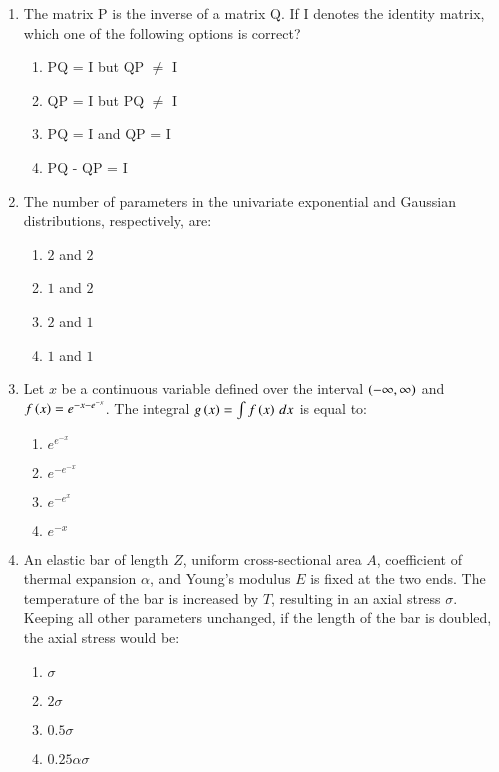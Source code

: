 \documentclass[journal,9pt,onecolumn]{IEEEtran}
\begin{document}
\begin{enumerate}

\item The matrix P is the inverse of a matrix Q. If I denotes the identity matrix, which one of the following options is correct?
\begin{multicols}{4}
    \begin{enumerate}
        \item PQ = I but QP $\ne$ I
        \item QP = I but PQ $\ne$ I
        \item PQ = I and QP = I
        \item PQ - QP = I
    \end{enumerate}
\end{multicols}

\item The number of parameters in the univariate exponential and Gaussian distributions, respectively, are:
\begin{multicols}{4}
    \begin{enumerate}
        \item $2$ and $2$
        \item $1$ and $2$
        \item $2$ and $1$
        \item $1$ and $1$
    \end{enumerate}
\end{multicols}


\item Let $x$ be a continuous variable defined over the interval $\left(-\infty, \infty\right)$ and $f\left(x\right) = e^{-x - e^{-x}}$. The integral $g\left(x\right) = \int f\left(x\right) \, dx$ is equal to:
    \begin{multicols}{4}
        \begin{enumerate}
            \item $e^{e^{-x}}$
            \item $e^{-e^{-x}}$
            \item $e^{-e^{x}}$
            \item $e^{-x}$
        \end{enumerate}
    \end{multicols}
    
\item An elastic bar of length $Z$, uniform cross-sectional area $A$, coefficient of thermal expansion $\alpha$, and Young's modulus $E$ is fixed at the two ends. The temperature of the bar is increased by $T$, resulting in an axial stress $\sigma$. Keeping all other parameters unchanged, if the length of the bar is doubled, the axial stress would be:
\begin{multicols}{4}
    \begin{enumerate}
        \item $\sigma$
        \item $2\sigma$
        \item $0.5 \sigma$
        \item $0.25 \alpha \sigma$
    \end{enumerate}
\end{multicols}


\end{enumerate}
\end{document}
